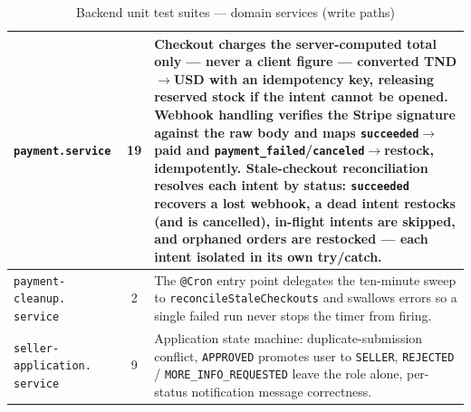 \documentclass[12pt, a4paper, oneside]{report}
\begin{document}
\begin{table}[H]
\begin{tabular}{|>{\raggedright\arraybackslash}p{3.8cm}|c|>{\raggedright\arraybackslash}p{6.8cm}|}
\hline
\texttt{payment.service} & 19 & Checkout charges the server-computed total only --- never a client figure --- converted TND$\to$USD with an idempotency key, releasing reserved stock if the intent cannot be opened. Webhook handling verifies the Stripe signature against the raw body and maps \texttt{succeeded}$\to$paid and \texttt{payment\_failed}/\texttt{canceled}$\to$restock, idempotently. Stale-checkout reconciliation resolves each intent by status: \texttt{succeeded} recovers a lost webhook, a dead intent restocks (and is cancelled), in-flight intents are skipped, and orphaned orders are restocked --- each intent isolated in its own try/catch. \\
\hline
\texttt{payment-cleanup.
service} & 2 & The \texttt{@Cron} entry point delegates the ten-minute sweep to \texttt{reconcileStaleCheckouts} and swallows errors so a single failed run never stops the timer from firing. \\
\hline
\texttt{seller-application.
service} & 9 & Application state machine: duplicate-submission conflict, \texttt{APPROVED} promotes user to \texttt{SELLER}, \texttt{REJECTED} / \texttt{MORE\_INFO\_REQUESTED} leave the role alone, per-status notification message correctness. \\
\hline
\end{tabular}
\caption{Backend unit test suites — domain services (write paths)}
\label{tab:backend-units-domain}
\end{table}
\end{document}
